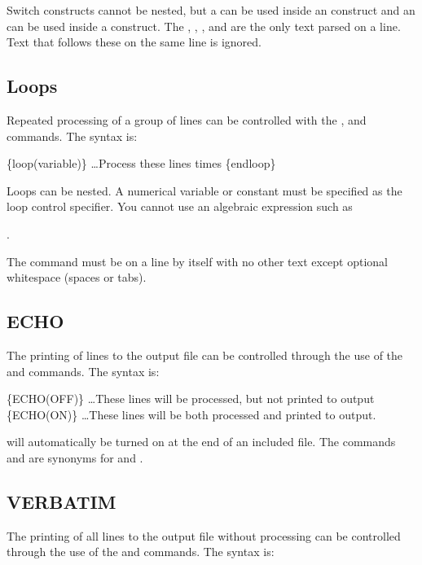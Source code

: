 Switch constructs cannot be nested, but a  can be used inside an  construct and an  can be used inside a  construct. 
The , , , and  are the only text parsed on a line. Text that follows these on the same line is
ignored.

\subsection{Loops} Repeated processing of a group of lines can be controlled 
with the , and  commands. The syntax is:
\begin{apinp}
\{loop(variable)\}
\ldots Process these lines  times
\{endloop\}
\end{apinp}

Loops can be nested. A numerical variable or constant must be specified as the 
loop control specifier. You cannot use an algebraic expression such as

.

The  command must be on a line by itself with no other text except optional whitespace (spaces or tabs).

\subsection{ECHO}\label{echo} The printing of lines to the output file can be controlled 
through the use of the  and  
commands. The syntax is:

\begin{apinp}
\{ECHO(OFF)\}
\ldots These lines will be processed, but not printed to output
\{ECHO(ON)\}
\ldots These lines will be both processed and printed to output.
\end{apinp}

 will automatically be turned on at the end of an included file. The 
commands  and  are synonyms for  and .

\subsection{VERBATIM} The printing of all lines to the output file without processing 
can be controlled through the use of the  and  
commands. The syntax is:

